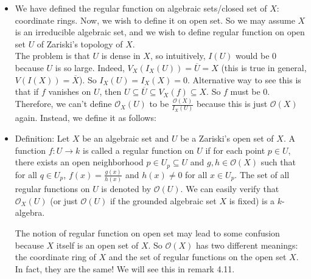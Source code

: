 \documentclass[15pt]{scrartcl}
\newcommand{\cO}{\mathcal{O}}
\begin{document}
\begin{itemize}
    \subsection{Regular Function on Zariski's Open Set}
    Given a zariski's topology on an algebraic set $X$,
    \item We have defined the regular function on algebraic sets/closed set of $X$: coordinate rings. Now, we wish to define it on open set. So we may assume $X$ is an irreducible algebraic set, and we wish to define regular function on open set $U$ of Zariski's topology of $X$. 
    \\
    The problem is that $U$ is dense in $X$, so intuitively, $I(U)$ would be $0$ because $U$ is so large. Indeed, $V_X(I_X(U))=\overline{U}=X$ (this is true in general, $V(I(X))=\overline{X}$). So $I_X(U)=I_X(X)=0$. Alternative way to see this is that if $f$ vanishes on $U$, then $U\subseteq \overline{U}\subseteq V_X(f)\subseteq X$. So $f$ must be $0$. 
    \\
    Therefore, we can't define $\mathcal{O}_X(U)$ to be $\frac{\mathcal{O}(X)}{I_X(U)}$ because this is just $\mathcal{O}(X)$ again. Instead, we define it as follows:
    \item Definition: Let $X$ be an algebraic set and $U$ be a Zariski's open set of $X$. A function $f:U\to k$ is called a regular function on $U$ if for each point $p\in U$, there exists an open neighborhood $p\in U_p\subseteq U$ and $g,h\in \mathcal{O}(X)$ such that for all $q\in U_p$, $f(x)=\frac{g(x)}{h(x)}$ and $h(x)\neq 0$ for all $x\in U_p$. The set of all regular functions on $U$ is denoted by $\mathcal{O}(U)$. We can easily verify that $\mathcal{O}_X(U)$ (or just $\cO(U)$ if the grounded algebraic set $X$ is fixed) is a $k$-algebra.
    \begin{remark}
        The notion of regular function on open set may lead to some confusion because $X$ itself is an open set of $X$. So $\mathcal{O}(X)$ has two different meanings: the coordinate ring of $X$ and the set of regular functions on the open set $X$. In fact, they are the same! We will see this in remark 4.11. 
    \end{remark}
    

\end{itemize}
\end{document}

